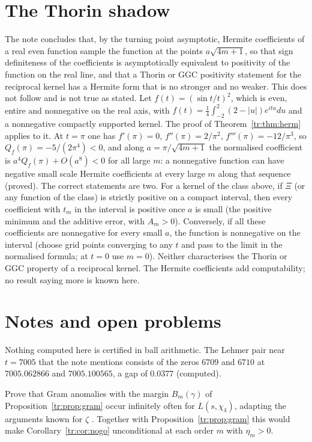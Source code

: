 \section{The Thorin shadow}\label{tr:sec:shadow}

The note concludes that, by the turning point asymptotic, Hermite coefficients of a real even function sample the function at the points $a\sqrt{4m+1}$, so that sign definiteness of the coefficients is asymptotically equivalent to positivity of the function on the real line, and that a Thorin or GGC positivity statement for the reciprocal kernel has a Hermite form that is no stronger and no weaker. This does not follow and is not true as stated. Let $f(t)=(\sin t/t)^2$, which is even, entire and nonnegative on the real axis, with $f(t)=\frac14\int_{-2}^2(2-|u|)e^{itu}du$ and a nonnegative compactly supported kernel. The proof of Theorem~\ref{tr:thm:herm} applies to it. At $t=\pi$ one has $f'(\pi)=0$, $f''(\pi)=2/\pi^2$, $f'''(\pi)=-12/\pi^3$, so $Q_f(\pi)=-5/(2\pi^4)<0$, and along $a=\pi/\sqrt{4m+1}$ the normalised coefficient is $a^4Q_f(\pi)+O(a^8)<0$ for all large $m$: a nonnegative function can have negative small scale Hermite coefficients at every large $m$ along that sequence (proved). The correct statements are two. For a kernel of the class above, if $\Xi$ (or any function of the class) is strictly positive on a compact interval, then every coefficient with $t_m$ in the interval is positive once $a$ is small (the positive minimum and the additive error, with $A_m>0$). Conversely, if all these coefficients are nonnegative for every small $a$, the function is nonnegative on the interval (choose grid points converging to any $t$ and pass to the limit in the normalised formula; at $t=0$ use $m=0$). Neither characterises the Thorin or GGC property of a reciprocal kernel. The Hermite coefficients add computability; no result saying more is known here.

\section{Notes and open problems}\label{tr:sec:trnotes}

Nothing computed here is certified in ball arithmetic. The Lehmer pair near $t=7005$ that the note mentions consists of the zeros $6709$ and $6710$ at $7005.062866$ and $7005.100565$, a gap of $0.0377$ (computed).



\begin{problem}\label{tr:prob:gram}
Prove that Gram anomalies with the margin $B_m(\gamma)$ of Proposition~\ref{tr:prop:gram} occur infinitely often for $L(s,\chi_4)$, adapting the arguments known for $\zeta$ \cite{Trudgian11b}. Together with Proposition~\ref{tr:prop:gram} this would make Corollary~\ref{tr:cor:nogo} unconditional at each order $m$ with $\eta_m>0$.
\end{problem}

